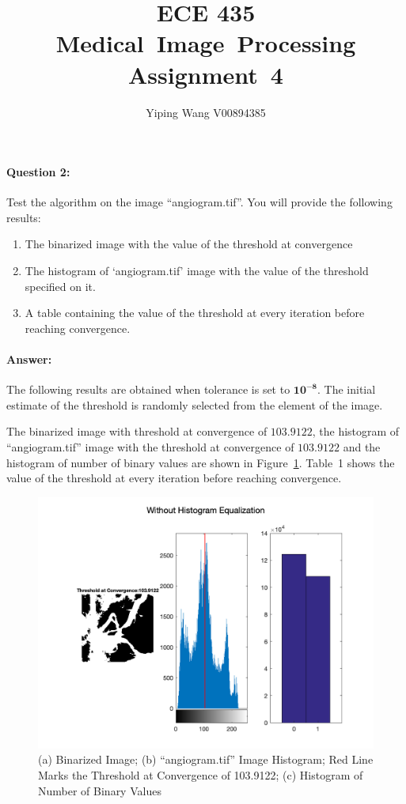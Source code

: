 \documentclass[12pt, letter]{article}
\newcommand{\courseName}{ECE 435 Medical~Image~Processing}
\newcommand{\assignName}{Assignment~4}
\begin{document}
\pagestyle{titlesec_assignment}

\title{\courseName\\\assignName}
\author{Yiping Wang V00894385}
\maketitle

\paragraph{Question 2:} Test the algorithm on the image ``angiogram.tif''. You will provide the following results:
\begin{enumerate}
    \item The binarized image with the value of the threshold at convergence
    \item The histogram of ‘angiogram.tif’ image with the value of the threshold specified on it.
    \item A table containing the value of the threshold at every iteration before reaching convergence.
\end{enumerate}

\paragraph{Answer:}
The following results are obtained when tolerance is set to $\mathbf{10^{-8}}$. The initial estimate of the threshold is randomly selected from the element of the image.  

The binarized image with threshold at convergence of $\mathbf{103.9122}$, the histogram of ``angiogram.tif'' image with the threshold at convergence of $\mathbf{103.9122}$ and the histogram of number of binary values are shown in Figure~\ref{fig:q2-1}. Table~1 shows the value of the threshold at every iteration before reaching convergence.

\begin{figure}
    \centering
    \includegraphics[width=14cm]{without-histogram-equalization.png}
    \caption{(a) Binarized Image; (b)  ``angiogram.tif'' Image Histogram; Red Line Marks the Threshold at Convergence of 103.9122; (c) Histogram of Number of Binary Values}
    \label{fig:q2-1}
\end{figure}
\end{document}
